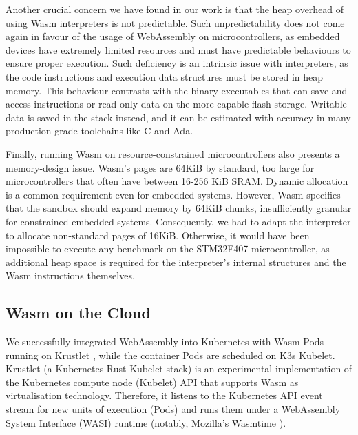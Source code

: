 

Another crucial concern we have found in our work is that the heap overhead of using Wasm interpreters is not predictable. Such unpredictability does not come again in favour of the usage of WebAssembly on microcontrollers, as embedded devices have extremely limited resources and must have predictable behaviours to ensure proper execution. Such deficiency is an intrinsic issue with interpreters, as the code instructions and execution data structures must be stored in heap memory. This behaviour contrasts with the binary executables that can save and access instructions or read-only data on the more capable flash storage. Writable data is saved in the stack instead, and it can be estimated with accuracy in many production-grade toolchains like C and Ada.

Finally, running Wasm on resource-constrained microcontrollers also presents a memory-design issue. Wasm's pages are 64KiB by standard, too large for microcontrollers that often have between 16-256 KiB SRAM. Dynamic allocation is a common requirement even for embedded systems. However, Wasm specifies that the sandbox should expand memory by 64KiB chunks, insufficiently granular for constrained embedded systems. Consequently, we had to adapt the interpreter to allocate non-standard pages of 16KiB. Otherwise, it would have been impossible to execute any benchmark on the STM32F407 microcontroller, as additional heap space is required for the interpreter's internal structures and the Wasm instructions themselves.

\subsection{Wasm on the Cloud}

We successfully integrated WebAssembly into Kubernetes with Wasm Pods running on Krustlet \cite{krustlet}, while the container Pods are scheduled on K3s \cite{k3s} Kubelet. Krustlet (a Kubernetes-Rust-Kubelet stack) is an experimental implementation of the Kubernetes compute node (Kubelet) API that supports Wasm as virtualisation technology. Therefore, it listens to the Kubernetes API event stream for new units of execution (Pods) and runs them under a WebAssembly System Interface (WASI) runtime (notably, Mozilla's Wasmtime \cite{wasmtime}).


